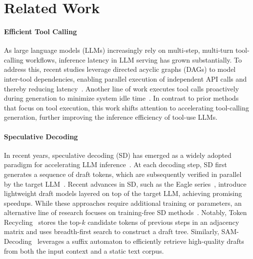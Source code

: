\section{Related Work}

\paragraph{Efficient Tool Calling}
As large language models (LLMs) increasingly rely on multi-step, multi-turn tool-calling workflows, inference latency in LLM serving has grown substantially. To address this, recent studies leverage directed acyclic graphs (DAGs) to model inter-tool dependencies, enabling parallel execution of independent API calls and thereby reducing latency~\cite{LLMCompiler, zhu2025:dividethenaggregate}. Another line of work executes tool calls proactively during generation to minimize system idle time~\citep{xu2024conveyor, nichols2025spec}. In contrast to prior methods that focus on tool execution, this work shifts attention to accelerating tool-calling generation, further improving the inference efficiency of tool-use LLMs.

\paragraph{Speculative Decoding}
In recent years, speculative decoding (SD) has emerged as a widely adopted paradigm for accelerating LLM inference~\cite{leviathan:2023spec, xia:2023specdec}. At each decoding step, SD first generates a sequence of draft tokens, which are subsequently verified in parallel by the target LLM~\citep{xia:2024survey}. Recent advances in SD, such as the Eagle series~\citep{eagle, li2024:eagle2, li2025:eagle3}, introduce lightweight draft models layered on top of the target LLM, achieving promising speedups. While these approaches require additional training or parameters, an alternative line of research focuses on training-free SD methods~\citep{luo:2025tokenrecycle, saxena2023pld, SWIFT}. Notably, Token Recycling~\citep{luo:2025tokenrecycle} stores the top-$k$ candidate tokens of previous steps in an adjacency matrix and uses breadth-first search to construct a draft tree. Similarly, SAM-Decoding~\citep{hu2025:samd} leverages a suffix automaton to efficiently retrieve high-quality drafts from both the input context and a static text corpus.